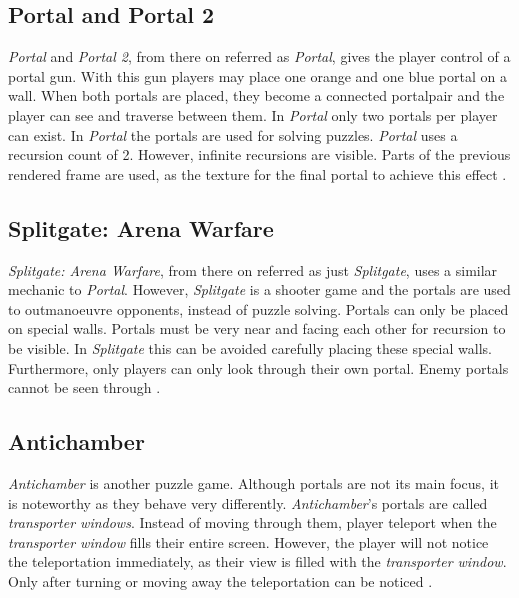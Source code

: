 \subsection{Portal and Portal 2}
\textit{Portal} and \textit{Portal 2}, from there on referred as \textit{Portal}, gives the player control of a portal gun. With this gun players may place one orange and one blue portal on a wall. When both portals are placed, they become a connected \gls{portalpair} and the player can see and traverse between them. In \textit{Portal} only two portals per player can exist. In \textit{Portal} the portals are used for solving puzzles. \textit{Portal} uses a recursion count of 2. However, infinite recursions are visible. Parts of the previous rendered frame are used, as the texture for the final portal to achieve this effect \cite{lecture:portalProblems}.

\subsection{Splitgate: Arena Warfare}
\textit{Splitgate: Arena Warfare}, from there on referred as just \textit{Splitgate}, uses a similar mechanic to \textit{Portal}. However, \textit{Splitgate} is a shooter game and the portals are used to outmanoeuvre opponents, instead of puzzle solving. Portals can only be placed on special walls. Portals must be very near and facing each other for recursion to be visible. In \textit{Splitgate} this can be avoided carefully placing these special walls.  Furthermore, only players can only look through their own portal. Enemy portals cannot be seen through \cite{splitgate}.

\subsection{Antichamber}
\textit{Antichamber} is another puzzle game. Although portals are not its main focus, it is noteworthy as they behave very differently. \textit{Antichamber}'s portals are called \textit{transporter windows}. Instead of moving through them, player teleport when the \textit{transporter window} fills their entire screen. However, the player will not notice the teleportation immediately, as their view is filled with the \textit{transporter window}. Only after turning or moving away the teleportation can be noticed \cite{antichamber}.

